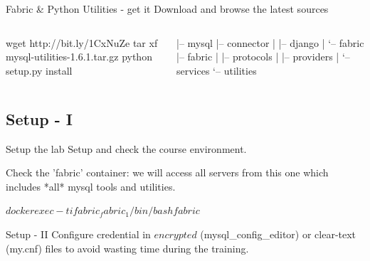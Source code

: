 \documentclass{beamer}[10]
\begin{document}
\begin{pyframe}{Fabric \& Python Utilities - get it}
Download and browse the latest sources
\begin{columns}[t]
    \begin{bashcode}
    wget http://bit.ly/1CxNuZe
    tar xf mysql-utilities-1.6.1.tar.gz
    python setup.py install
    \end{bashcode}
\begin{bashcode}
   |-- mysql
   |-- connector
   |   |-- django
   |   `-- fabric
   |-- fabric
   |   |-- protocols
   |   |-- providers
   |   `-- services
   `-- utilities
\end{bashcode}
\end{columns}

\end{pyframe}

\subsection{Setup - I}
\begin{pyframe}{Setup the lab}
Setup and check the course environment.

Check the 'fabric' container: we will access all servers from this
 one which includes *all* mysql tools and utilities.
\begin{bashcode}
$ docker exec -ti fabric_fabric_1 /bin/bash
fabric$
\end{bashcode}
\end{pyframe}


\begin{pyframe}{Setup - II}
Configure credential in $encrypted$ (mysql_config_editor)
or clear-text (my.cnf) files to avoid wasting time during
the training.
 \\
\end{pyframe}
\end{document}
